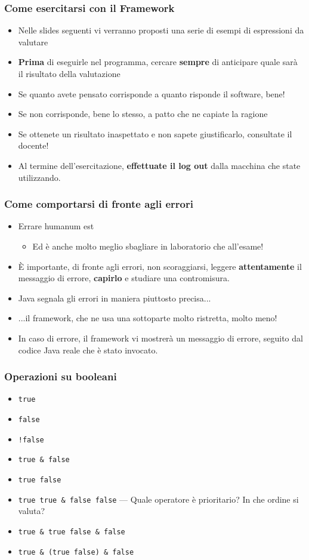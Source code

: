 \documentclass{beamer}
\begin{document}
\begin{frame}
\frametitle{Come esercitarsi con il Framework}
\begin{itemize}
 \item Nelle slides seguenti vi verranno proposti una serie di esempi di espressioni da valutare
 \item \textbf{Prima} di eseguirle nel programma, cercare \textbf{sempre} di anticipare quale sarà il risultato della valutazione
 \item Se quanto avete pensato corrisponde a quanto risponde il software, bene!
 \item Se non corrisponde, bene lo stesso, a patto che ne capiate la ragione
 \item Se ottenete un risultato inaspettato e non sapete giustificarlo, consultate il docente!
 \item Al termine dell'esercitazione, \textbf{effettuate il log out} dalla macchina che state utilizzando.
\end{itemize}
\end{frame}

\begin{frame}
\frametitle{Come comportarsi di fronte agli errori}
\begin{itemize}
 \item Errare humanum est
  \begin{itemize}
    \item Ed è anche molto meglio sbagliare in laboratorio che all'esame!
  \end{itemize}
 \item È importante, di fronte agli errori, non scoraggiarsi, leggere \textbf{attentamente} il messaggio di errore, \textbf{capirlo} e studiare una contromisura.
 \item Java segnala gli errori in maniera piuttosto precisa...
 \item ...il framework, che ne usa una sottoparte molto ristretta, molto meno!
 \item In caso di errore, il framework vi mostrerà un messaggio di errore, seguito dal codice Java reale che è stato invocato.
\end{itemize}
\end{frame}

\begin{frame}
\frametitle{Operazioni su booleani}
\begin{itemize}
 \item \texttt{true}
 \item \texttt{false}
 \item \texttt{!false}
 \item \texttt{true \& false}
 \item \texttt{true \textbar{} false}
 \item \texttt{true \textbar{} true \& false \textbar{} false} --- Quale operatore è prioritario? In che ordine si valuta?
 \item \texttt{true \& true \textbar{} false \& false}
 \item \texttt{true \& (true \textbar{} false) \& false}
\end{itemize}
\end{frame}
\end{document}
